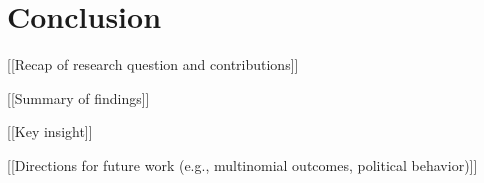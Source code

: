 \section{Conclusion}

[[Recap of research question and contributions]]

[[Summary of findings]]

[[Key insight]]


[[Directions for future work (e.g., multinomial outcomes, political behavior)]]